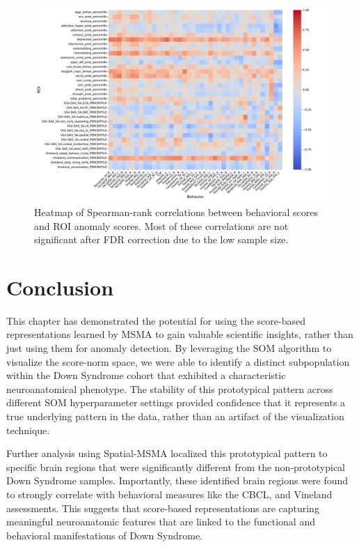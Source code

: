 \begin{figure}[tbhp]
\centering
\includegraphics[width=\linewidth]{figures/full_corrmatrix.pdf}
\caption{Heatmap of Spearman-rank correlations between behavioral scores and ROI anomaly scores. Most of these correlations are not significant after FDR correction due to the low sample size.}
\label{fig:full-roi-corr}
\end{figure}


\section{Conclusion}

This chapter has demonstrated the potential for using the score-based representations learned by MSMA to gain valuable scientific insights, rather than just using them for anomaly detection. By leveraging the SOM algorithm to visualize the score-norm space, we were able to identify a distinct subpopulation within the Down Syndrome cohort that exhibited a characteristic neuroanatomical phenotype. The stability of this prototypical pattern across different SOM hyperparameter settings provided confidence that it represents a true underlying pattern in the data, rather than an artifact of the visualization technique.

Further analysis using Spatial-MSMA localized this prototypical pattern to specific brain regions that were significantly different from the non-prototypical Down Syndrome samples. Importantly, these identified brain regions were found to strongly correlate with behavioral measures like the CBCL, and Vineland assessments. This suggests that score-based representations are capturing meaningful neuroanatomic features that are linked to the functional and behavioral manifestations of Down Syndrome.

